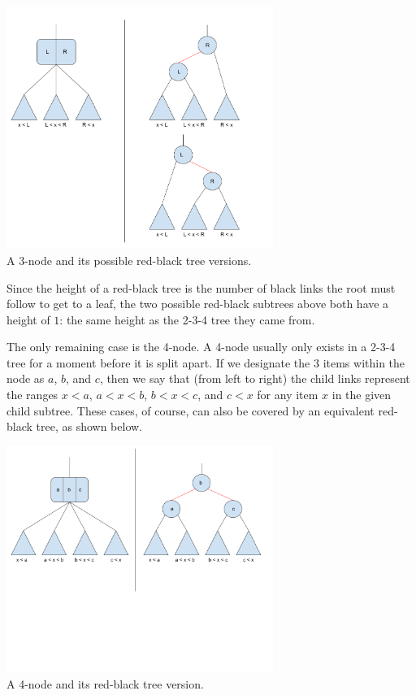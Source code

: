 \documentclass[12pt]{amsart}
\begin{document}
\begin{center}
    \includegraphics[width=0.65\textwidth]{rb_tree_1} \\
    A 3-node and its possible red-black tree versions. \\
    \vskip 1cm
\end{center}

    Since the height of a red-black tree is the number of black
    links the root must follow to get to a leaf, the two
    possible red-black subtrees above both have a height of $1$:
    the same height as the 2-3-4 tree they came from.

    The only remaining case is the 4-node. A 4-node usually only
    exists in a 2-3-4 tree for a moment before it is split
    apart. If we designate the $3$ items within the node as
    $a$, $b$, and $c$, then we say that (from left to right) the
    child links represent the ranges $x < a$, $a < x < b$,
    $b < x < c$, and $c < x$ for any item $x$ in the given
    child subtree. These cases, of course, can also be covered
    by an equivalent red-black tree, as shown below.

\begin{center}
    \includegraphics[width=0.65\textwidth]{rb_tree_2} \\
    A 4-node and its red-black tree version. \\
    \vskip 1cm
\end{center}
\end{document}
